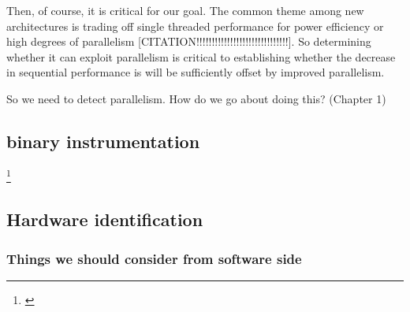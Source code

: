 \documentclass[12pt,twoside]{reedthesis}
\begin{document}
		Then, of course, it is critical for our goal. The common theme among new architectures is trading off single threaded performance for power efficiency or high degrees of parallelism [CITATION!!!!!!!!!!!!!!!!!!!!!!!!!!!!!!].
		So determining whether it can exploit parallelism is critical to establishing whether the decrease in sequential performance is will be sufficiently offset by improved parallelism.

		So we need to detect parallelism. How do we go about doing this? (Chapter 1)

	\subsection{binary instrumentation}
		\footnote{\cite{Luk:2005}}

	\subsection{Hardware identification}

	\subsubsection{Things we should consider from software side}
\end{document}
